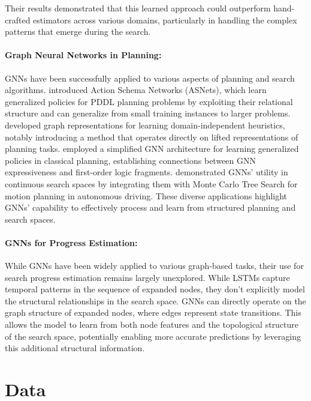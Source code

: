 \documentclass[letterpaper]{article}
\begin{document}
Their results demonstrated that this learned approach could outperform hand-crafted estimators across various domains, particularly in handling the complex patterns that emerge during the search.

\paragraph{Graph Neural Networks in Planning:} GNNs have been successfully applied to various aspects of planning and search algorithms. \citet{toyer2020asnets} introduced Action Schema Networks (ASNets), which learn generalized policies for PDDL planning problems by exploiting their relational structure and can generalize from small training instances to larger problems. \citet{chen2024learning} developed graph representations for learning domain-independent heuristics, notably introducing a method that operates directly on lifted representations of planning tasks. \citet{staahlberg2022learning} employed a simplified GNN architecture for learning generalized policies in classical planning, establishing connections between GNN expressiveness and first-order logic fragments. \citet{9636442} demonstrated GNNs' utility in continuous search spaces by integrating them with Monte Carlo Tree Search for motion planning in autonomous driving. These diverse applications highlight GNNs' capability to effectively process and learn from structured planning and search spaces.

\paragraph{GNNs for Progress Estimation:} While GNNs have been widely applied to various graph-based tasks, their use for search progress estimation remains largely unexplored.
While LSTMs capture temporal patterns in the sequence of expanded nodes, they don't explicitly model the structural relationships in the search space. GNNs can directly operate on the graph structure of expanded nodes, where edges represent state transitions. This allows the model to learn from both node features and the topological structure of the search space, potentially enabling more accurate predictions by leveraging this additional structural information.

\section{Data}
\end{document}
